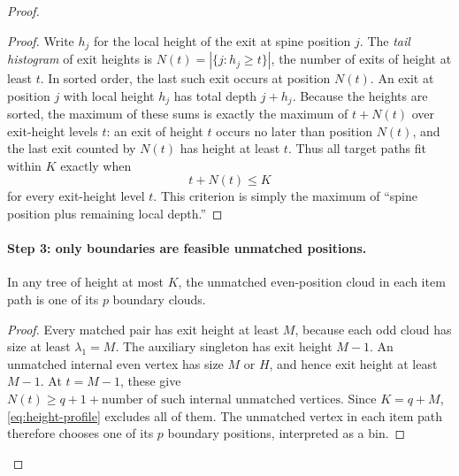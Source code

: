 \begin{proof}
\begin{proof}
Write $h_j$ for the local height of the exit at spine position $j$.
The \emph{tail histogram} of exit heights is
$N(t)=|\{j:h_j\ge t\}|$, the number of exits of height at least $t$.
In sorted order, the last such exit occurs at position $N(t)$.
An exit at position $j$ with local height $h_j$ has total depth
$j+h_j$. Because the heights are sorted, the maximum of these sums
is exactly the maximum of $t+N(t)$ over exit-height levels $t$:
an exit of height $t$ occurs no later
than position $N(t)$, and the last exit counted by $N(t)$ has height
at least $t$. Thus all target paths fit within $K$ exactly when
\begin{equation}\label{eq:height-profile}
 t+N(t)\le K
\end{equation}
for every exit-height level $t$.
This criterion is simply the maximum of ``spine position plus
remaining local depth.''
\end{proof}

\paragraph{Step 3: only boundaries are feasible unmatched positions.}
\begin{claim}
In any tree of height at most $K$, the unmatched even-position
cloud in each item path is one of its $p$ boundary clouds.
\end{claim}
\begin{proof}
Every matched pair has exit height at least $M$, because each odd
cloud has size at least $\lambda_1=M$. The auxiliary singleton has exit
height $M-1$. An unmatched internal even vertex has size $M$ or $H$,
and hence exit height at least $M-1$.
At $t=M-1$, these give
$N(t)\ge q+1+\text{number of such internal unmatched vertices}$.
Since $K=q+M$, \eqref{eq:height-profile} excludes all of them.
The unmatched vertex in each item path therefore chooses one of
its $p$ boundary positions, interpreted as a bin.
\end{proof}


\end{proof}
